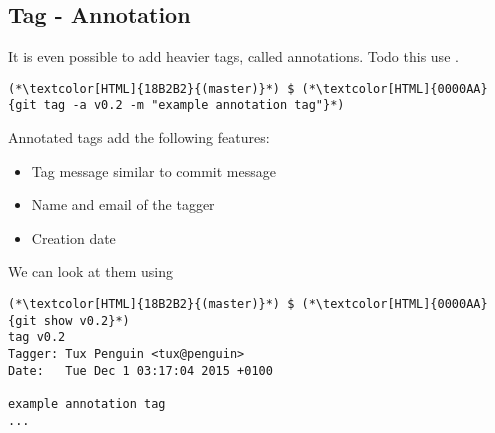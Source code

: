 \subsection{Tag - Annotation}
\begin{frame}[fragile]
  \subslidetitle
  It is even possible to add heavier tags, called annotations. Todo this use .

  \begin{lstlisting}
(*\textcolor[HTML]{18B2B2}{(master)}*) $ (*\textcolor[HTML]{0000AA}{git tag -a v0.2 -m "example annotation tag"}*)
\end{lstlisting}

  Annotated tags add the following features:
  \begin{itemize}
    \item Tag message similar to commit message
    \item Name and email of the tagger
    \item Creation date
  \end{itemize}

  We can look at them using 
  \begin{lstlisting}
(*\textcolor[HTML]{18B2B2}{(master)}*) $ (*\textcolor[HTML]{0000AA}{git show v0.2}*)
tag v0.2
Tagger: Tux Penguin <tux@penguin>
Date:   Tue Dec 1 03:17:04 2015 +0100

example annotation tag
...
\end{lstlisting}

\end{frame}

